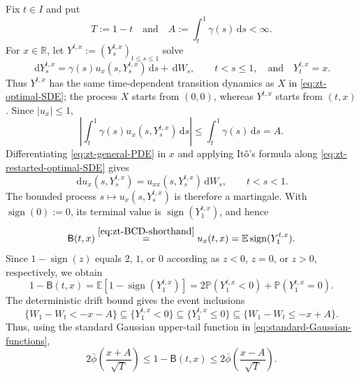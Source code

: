 \documentclass[10pt]{amsart}
\theoremstyle{definition}
\theoremstyle{remark}
\numberwithin{equation}{section}
\newcommand{\R}{\mathbb R}
\newcommand{\E}{\mathbb E}
\newcommand{\PP}{\mathbb P}
\newcommand{\1}{\mathbf 1}
\newcommand{\dd}{\,\mathrm d}
\newcommand{\stackref}[2]{\stackrel{#2}{#1}}
\begin{document}
Fix $t\in I$ and put
\begin{equation*}
 T:=1-t\quad\text{and}\quad A:=\int_t^1\gamma(s)\dd s<\infty.
\end{equation*}
For $x\in\R$, let $Y^{t,x}:=(Y_s^{t,x})_{t\leq s\leq1}$ solve
\begin{equation}
 \dd Y_s^{t,x}=\gamma(s)u_x(s,Y_s^{t,x})\dd s+\dd W_s,
 \qquad t<s\leq1,
 \quad\text{and}\quad Y_t^{t,x}=x.
 \label{eq:zt-restarted-optimal-SDE}
\end{equation}
Thus $Y^{t,x}$ has the same time-dependent transition dynamics as $X$ in \eqref{eq:zt-optimal-SDE}; the process $X$ starts from $(0,0)$, whereas $Y^{t,x}$ starts from $(t,x)$. Since $|u_x|\leq1$,
\begin{equation*}
 \left|\int_t^1\gamma(s)u_x(s,Y_s^{t,x})\dd s\right|
 \leq\int_t^1\gamma(s)\dd s=A.
\end{equation*}
Differentiating \eqref{eq:zt-general-PDE} in $x$ and applying It\^o's formula along \eqref{eq:zt-restarted-optimal-SDE} gives
\begin{equation*}
 \dd u_x(s,Y_s^{t,x})=u_{xx}(s,Y_s^{t,x})\dd W_s,
 \qquad t<s<1.
\end{equation*}
The bounded process $s\mapsto u_x(s,Y_s^{t,x})$ is therefore a martingale. With $\operatorname{sign}(0):=0$, its terminal value is $\operatorname{sign}(Y_1^{t,x})$, and hence
\begin{equation*}
 \mathsf B(t,x)
 \stackref{=}{\eqref{eq:zt-BCD-shorthand}}
 u_x(t,x)=\E\operatorname{sign}(Y_1^{t,x}).
\end{equation*}
Since $1-\operatorname{sign}(z)$ equals $2$, $1$, or $0$ according as $z<0$, $z=0$, or $z>0$, respectively, we obtain
\begin{equation*}
 1-\mathsf B(t,x)
 =\E[1-\operatorname{sign}(Y_1^{t,x})]
 =2\PP(Y_1^{t,x}<0)+\PP(Y_1^{t,x}=0).
\end{equation*}
The deterministic drift bound gives the event inclusions
\begin{equation*}
 \{W_1-W_t<-x-A\}\subseteq\{Y_1^{t,x}<0\}
 \subseteq\{Y_1^{t,x}\leq0\}
 \subseteq\{W_1-W_t\leq-x+A\}.
\end{equation*}
Thus, using the standard Gaussian upper-tail function in \eqref{eq:standard-Gaussian-functions},
\begin{equation}
 2\bar\phi\left(\frac{x+A}{\sqrt T}\right)
 \leq1-\mathsf B(t,x)\leq
 2\bar\phi\left(\frac{x-A}{\sqrt T}\right).
 \label{eq:zt-B-Gaussian-bracket}
\end{equation}
\end{document}
